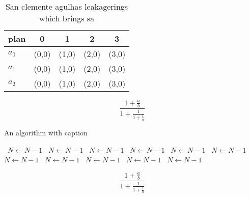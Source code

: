 \documentclass[a4paper]{article}
\begin{document}
\begin{table}
\begin{adjustbox}{width=0.6\columnwidth}
\begin{tabular}{|l|l|l|l|l|}
\hline
\textbf{plan} & \multicolumn{1}{c|}{\textbf{0}} & \multicolumn{1}{c|}{\textbf{1}} & \multicolumn{1}{c|}{\textbf{2}} & \multicolumn{1}{c|}{\textbf{3}} \\ \hline
\textbf{$a_0$}  & (0,0) & (1,0) & (2,0) & (3,0) \\ \hline
\textbf{$a_1$}  & (0,0) & (1,0) & (2,0) & (3,0) \\ \hline
\textbf{$a_2$}  & (0,0) & (1,0) & (2,0) & (3,0) \\ \hline
\end{tabular}
\end{adjustbox}
\caption{San clemente agulhas leakagerings which brings sa
}
\end{table}

\[ \frac{1+\frac{a}{b}}{1+\frac{1}{1+\frac{1}{a}}} \]

\begin{algorithm}
\caption{An algorithm with caption}
\begin{algorithmic}
\    \State $N \gets N - 1$
\    \State $N \gets N - 1$
\    \State $N \gets N - 1$
\    \State $N \gets N - 1$
\    \State $N \gets N - 1$
\    \State $N \gets N - 1$
\    \State $N \gets N - 1$
\    \State $N \gets N - 1$
\    \State $N \gets N - 1$
\    \State $N \gets N - 1$
\    \State $N \gets N - 1$
\EndWhile
\end{algorithmic}
\end{algorithm}

\[ \frac{1+\frac{a}{b}}{1+\frac{1}{1+\frac{1}{a}}} \]
\end{document}
